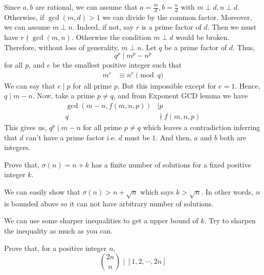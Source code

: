 \documentclass[problems.tex]{subfile}
\begin{document}
	\begin{solution}
		Since $a,b$ are rational, we can assume that $a=\frac{m}{d},b=\frac{n}{d}$ with $m\perp d,n\perp d$. Otherwise, if $\gcd(m,d)>1$ we can divide by the common factor. Moreover, we can assume $m\perp n$. Indeed, if not, say $r$ is a prime factor of $d$. Then we must have $r\nmid\gcd(m,n)$. Otherwise the condition $m\perp d$ would be broken. Therefore, without loss of generality, $m\perp n$. Let $q$ be a prime factor of $d$. Thus, \[q^p\mid m^p-n^p\] for all $p$, and $e$ be the smallest positive integer such that
			\begin{align*}
				m^e
					& \equiv n^e\pmod q
			\end{align*}
		We can say that $e\mid p$ for all prime $p$. But this impossible except for $e=1$. Hence, $q\mid m-n$. Now, take a prime $p\neq q$, and from Exponent GCD lemma we have
			\begin{align*}
				\gcd\left(m-n,f(m,n,p)\right)
					& \mid  p\\
				q
					& \nmid  f(m,n,p)
			\end{align*}
		This gives us, $q^p\mid m-n$ for all prime $p\neq q$ which leaves a contradiction inferring that $d$ can't have a prime factor i.e. $d$ must be $1$. And then, $a$ and $b$ both are integers.
	\end{solution}

	\begin{problem}
		Prove that, $\sigma(n)=n+k$ has a finite number of solutions for a fixed positive integer $k$.
	\end{problem}

	\begin{solution}
		We can easily show that $\sigma(n)>n+\sqrt{n}$ which says $k>\sqrt{n}$. In other words, $n$ is bounded above so it can not have arbitrary number of solutions.
	\end{solution}

	\begin{note}
		We can use some sharper inequalities to get a upper bound of $k$. Try to sharpen the inequality as much as you can.
	\end{note}

	\begin{problem}
		Prove that, for a positive integer $n$, \[\binom{2n}{n}\mid [1,2,\cdots,2n]\]
	\end{problem}
\end{document}
